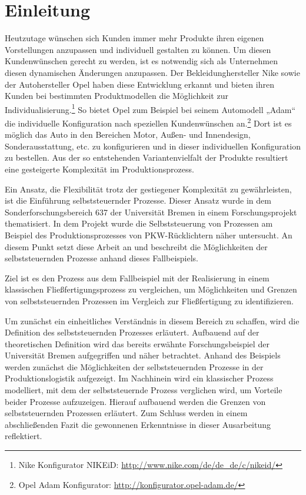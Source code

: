 \section{Einleitung}
\label{sec:Einleitung}
Heutzutage wünschen sich Kunden immer mehr Produkte ihren eigenen Vorstellungen
anzupassen und individuell gestalten zu können. Um diesen Kundenwünschen gerecht
zu werden, ist es notwendig sich als Unternehmen diesen dynamischen Änderungen
anzupassen.  Der Bekleidunghersteller Nike sowie der Autohersteller Opel haben
diese Entwicklung erkannt und bieten ihren Kunden bei bestimmten Produktmodellen
die Möglichkeit zur Individualisierung.\footnote{Nike Konfigurator NIKEiD:
\url{http://www.nike.com/de/de_de/c/nikeid/}} So bietet Opel zum Beispiel bei
seinem Automodell „Adam“ die individuelle Konfiguration nach speziellen
Kundenwünschen an.\footnote{Opel Adam Konfigurator:
\url{http://konfigurator.opel-adam.de/}} Dort ist es möglich das Auto in den
Bereichen Motor, Außen- und Innendesign, Sonderausstattung, etc. zu
konfigurieren und in dieser individuellen Konfiguration zu bestellen. Aus der
so entstehenden Variantenvielfalt der Produkte resultiert eine gesteigerte
Komplexität im Produktionsprozess.

Ein Ansatz, die Flexibilität trotz der gestiegener Komplexität zu gewährleisten,
ist die Einführung selbststeuernder Prozesse. Dieser Ansatz wurde in dem
Sonderforschungsbereich 637 der Universität Bremen in einem Forschungsprojekt
thematisiert. In dem Projekt wurde die Selbststeuerung von Prozessen am Beispiel
des Produktionsprozesses von PKW-Rücklichtern näher untersucht. An diesem Punkt
setzt diese Arbeit an und beschreibt die Möglichkeiten der selbststeuernden
Prozesse anhand dieses Fallbeispiels.

Ziel ist es den Prozess aus dem Fallbeispiel mit der Realisierung in einem
klassischen Fließfertigungsprozess zu vergleichen, um Möglichkeiten und Grenzen
von selbststeuernden Prozessen im Vergleich zur Fließfertigung zu
identifizieren.

Um zunächst ein einheitliches Verständnis in diesem Bereich zu schaffen, wird
die Definition des selbststeuernden Prozesses erläutert. Aufbauend auf der
theoretischen Definition wird das bereits erwähnte Forschungsbeispiel der
Universität Bremen aufgegriffen und näher betrachtet. Anhand des Beispiels
werden zunächst die Möglichkeiten der selbststeuernden Prozesse in der
Produktionslogistik aufgezeigt. Im Nachhinein wird ein klassischer Prozess
modelliert, mit dem der selbststeuernde Prozess verglichen wird, um Vorteile
beider Prozesse aufzuzeigen. Hierauf aufbauend werden die Grenzen von
selbststeuernden Prozessen erläutert. Zum Schluss werden in einem abschließenden
Fazit die gewonnenen Erkenntnisse in dieser Ausarbeitung reflektiert.

\clearpage
